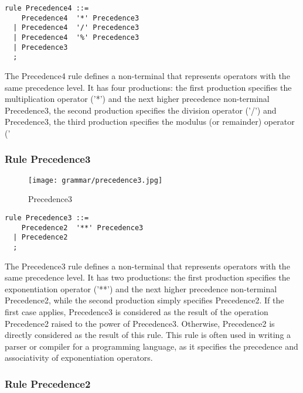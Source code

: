 \begin{lstlisting}
rule Precedence4 ::=
    Precedence4  '*' Precedence3 
  | Precedence4  '/' Precedence3 
  | Precedence4  '%' Precedence3 
  | Precedence3 
  ;
\end{lstlisting}

The Precedence4 rule defines a non-terminal that represents operators with the same precedence level. It has four productions: the first production specifies the multiplication operator ('*') and the next higher precedence non-terminal Precedence3, the second production specifies the division operator ('/') and Precedence3, the third production specifies the modulus (or remainder) operator ('%

\subsubsection*{Rule Precedence3}

\begin{figure}[!ht]
\centering
\texttt{[image: grammar/precedence3.jpg]}
\caption{Precedence3}
\end{figure}

\begin{lstlisting}
rule Precedence3 ::=
    Precedence2  '**' Precedence3 
  | Precedence2 
  ;
\end{lstlisting}

The Precedence3 rule defines a non-terminal that represents operators with the same precedence level. It has two productions: the first production specifies the exponentiation operator ('**') and the next higher precedence non-terminal Precedence2, while the second production simply specifies Precedence2. If the first case applies, Precedence3 is considered as the result of the operation Precedence2 raised to the power of Precedence3. Otherwise, Precedence2 is directly considered as the result of this rule. This rule is often used in writing a parser or compiler for a programming language, as it specifies the precedence and associativity of exponentiation operators.

\subsubsection*{Rule Precedence2}

